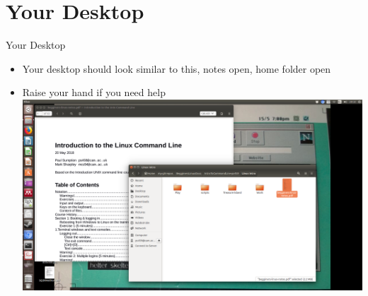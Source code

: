 \section{Your Desktop}
\begin{frame}{Your Desktop}
\begin{itemize}
\item Your desktop should look similar to this, notes open, home folder open
\item\alert{Raise your hand if you need help}
\includegraphics[height=0.5\textheight]{imgs/Desktop.png}
\end{itemize}
\end{frame}




